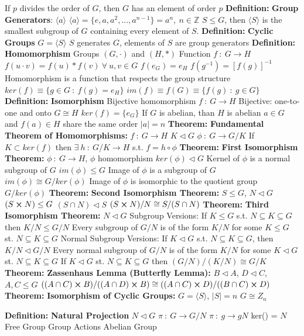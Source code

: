 \documentclass[14pt]{extarticle}
\def\Definition{{\color{blue} \textbf{Definition:} }}
\def\Theorem{{\color{red} \textbf{Theorem:} }}
\begin{document}
\begin{outline}
			\2	If $p$ divides the order of $G$, then $G$ has an element of order $p$
		\1	\Definition \textbf{Group Generators}: $\langle a \rangle$
			\2	$\langle a \rangle = \{e,a,a^2,...,a^{n-1}\} = a^n,~n \in \mathbb{Z}$
			\2	$S \le G$, then $\langle S \rangle$ is the smallest subgroup of $G$ containing
					every element of $S$.
		\1	\Definition \textbf{Cyclic Groups}
			\2	$G = \langle S \rangle$
			\2	$S$ generates $G$, elements of $S$ are group generators		
		\1	\Definition \textbf{Homomorphism}
			\2	Groups $(G,\cdot)$ and $(H,*)$
			\2	Function $f~:~G \rightarrow H$
				\3	$f(u \cdot v) = f(u) * f(v)~\forall~u,v \in G$
				\3	$f(e_G) = e_H$
				\3	$f(g^{-1}) = [f(g)]^{-1}$
			\2	Homomorphism is a function that respects the group structure
			\2	$ker(f) \equiv \{g \in G~:~f(g) = e_H\}$
			\2	$im(f) \equiv f(G) \equiv \{f(g)~:~g \in G\}$	
		\1	\Definition \textbf{Isomorphism}
			\2	Bijective homomorphism $f~:~G \rightarrow H$
				\3	Bijective: one-to-one and onto
			\2	$G \cong H$
			\2	$ker(f) = \{e_G\}$
			\2	If $G$ is abelian, than $H$ is abelian
			\2	$a \in G$ and $f(a) \in H$ share the same order $|a| = n$		
		\1	\Theorem \textbf{Fundamental Theorem of Homomorphisms:}
			\2	$f~:~G \rightarrow H$
			\2	$K \triangleleft G$
			\2	$\phi~:~G \rightarrow G/K$
			\2	{\color{purple}If $K \subset ker(f)$ then $\exists~h~:~G/K \rightarrow H$ 
						s.t. $f = h \circ \phi$}
		\1	\Theorem \textbf{First Isomorphism Theorem:}
			\2	$\phi~:~G \rightarrow H$, $\phi$ homomorphism
			\2	{\color{purple} $ker(\phi) \triangleleft G$}
				\3	Kernel of $\phi$ is a normal subgroup of $G$
			\2	{\color{purple} $im(\phi) \le G$}
				\3	Image of $\phi$ is a subgroup of $G$
			\2	{\color{purple} $im(\phi) \cong G/ker(\phi)$}
				\3	Image of $\phi$ is isomorphic to the quotient group $G/ker(\phi)$
		\1	\Theorem	\textbf{Second Isomorphism Theorem:}
			\2	$S \le G$, $N \triangleleft G$
			\2	{\color{purple}$(S \cross N) \le G$}
			\2	{\color{purple}$(S \cap N) \triangleleft S$}
			\2	{\color{purple}$(S \cross N)/N \cong S/(S\cap N)$}
		\1	\Theorem \textbf{Third Isomorphism Theorem:}
			\2	$N \triangleleft G$
			\2	Subgroup Versions:
				\3	{\color{purple} If $K \le G$ s.t. $N \subseteq K \subseteq G$ then 
							$K/N \le G/N$}
				\3	{\color{purple} Every subgroup of $G/N$ is of the form $K/N$ for 
						some $K \le G$ st. $N \subseteq K \subseteq G$}
			\2	Normal Subgroup Versions:
				\3	{\color{purple} If $K \triangleleft G$ s.t. $N \subseteq K \subseteq G$,
						then $K / N \triangleleft G/N$}
				\3	{\color{purple} Every normal subgroup of $G/N$ is of the form $K/N$
						for some $K \triangleleft G$ st. $N \subseteq K \subseteq G$}
				\3	{\color{purple} If $K \triangleleft G$ st. $N \subseteq K \subseteq G$ 
						then $(G/N)/(K/N) \cong G/K$}
		\1	\Theorem	\textbf{Zassenhaus Lemma (Butterfly Lemma):}
			\2	$B \triangleleft A$, $D \triangleleft C$, $A,C \le G$
			\2	{\color{purple} $((A \cap C) \cross B) / ((A \cap D) \cross B) \cong
						((A \cap C) \cross D) / ((B \cap C)\cross D)$}	
	\1	\Theorem \textbf{Isomorphism of Cyclic Groups:}
			\2	$G = \langle S \rangle$, $|S| = n$
			\2	{\color{purple} $G \cong Z_n$}
	
	\1	\Definition \textbf{Natural Projection}
		\2	$N \triangleleft G$
		\2	$\pi~:~G \rightarrow G/N$
		\2	$\pi~:~g \rightarrow gN$
		\2	ker(\pi) = $N$
	\1	Free Group		
	\1	Group Actions
	\1	Abelian Group
	
	\end{outline}
\end{document}
